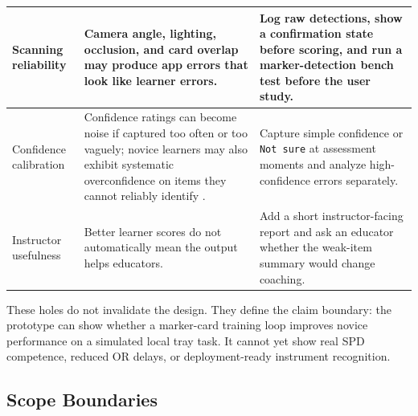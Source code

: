 \documentclass[10pt,a4paper]{article}
\begin{document}
\begin{table}[H]
\begin{tabularx}{\textwidth}{|>{\raggedright\arraybackslash}X|>{\raggedright\arraybackslash}X|>{\raggedright\arraybackslash}X|}
\hline
Scanning reliability & Camera angle, lighting, occlusion, and card overlap may produce app errors that look like learner errors. & Log raw detections, show a confirmation state before scoring, and run a marker-detection bench test before the user study. \\
\hline
Confidence calibration & Confidence ratings can become noise if captured too often or too vaguely; novice learners may also exhibit systematic overconfidence on items they cannot reliably identify \cite{kruger-dunning-1999}. & Capture simple confidence or \texttt{Not sure} at assessment moments and analyze high-confidence errors separately. \\
\hline
Instructor usefulness & Better learner scores do not automatically mean the output helps educators. & Add a short instructor-facing report and ask an educator whether the weak-item summary would change coaching. \\
\hline
\end{tabularx}
\end{table}
These holes do not invalidate the design. They define the claim boundary: the
prototype can show whether a marker-card training loop improves novice
performance on a simulated local tray task. It cannot yet show real SPD
competence, reduced OR delays, or deployment-ready instrument recognition.
\subsection{Scope Boundaries}
\end{document}

